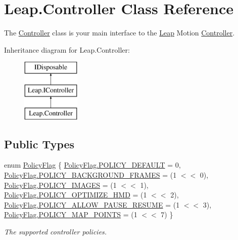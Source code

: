 \hypertarget{class_leap_1_1_controller}{}\section{Leap.\+Controller Class Reference}
\label{class_leap_1_1_controller}


The \mbox{\hyperlink{class_leap_1_1_controller}{Controller}} class is your main interface to the \mbox{\hyperlink{namespace_leap}{Leap}} Motion \mbox{\hyperlink{class_leap_1_1_controller}{Controller}}.  


Inheritance diagram for Leap.\+Controller\+:\begin{figure}[H]
\begin{center}
\leavevmode
\includegraphics[height=3.000000cm]{class_leap_1_1_controller}
\end{center}
\end{figure}
\subsection*{Public Types}
\begin{DoxyCompactItemize}
\item 
enum \mbox{\hyperlink{class_leap_1_1_controller_a0bdb49fa94aa2da8b098c1ac296528d6}{Policy\+Flag}} \{ \newline
\mbox{\hyperlink{class_leap_1_1_controller_a0bdb49fa94aa2da8b098c1ac296528d6ab59265c49564c97b26e7bcd5010a5f84}{Policy\+Flag.\+P\+O\+L\+I\+C\+Y\+\_\+\+D\+E\+F\+A\+U\+LT}} = 0, 
\mbox{\hyperlink{class_leap_1_1_controller_a0bdb49fa94aa2da8b098c1ac296528d6a9fc384525c1401b9857161b983424b2a}{Policy\+Flag.\+P\+O\+L\+I\+C\+Y\+\_\+\+B\+A\+C\+K\+G\+R\+O\+U\+N\+D\+\_\+\+F\+R\+A\+M\+ES}} = (1 $<$$<$ 0), 
\mbox{\hyperlink{class_leap_1_1_controller_a0bdb49fa94aa2da8b098c1ac296528d6a641dbeeedb2436f6a066543de846bd31}{Policy\+Flag.\+P\+O\+L\+I\+C\+Y\+\_\+\+I\+M\+A\+G\+ES}} = (1 $<$$<$ 1), 
\mbox{\hyperlink{class_leap_1_1_controller_a0bdb49fa94aa2da8b098c1ac296528d6abc23e8520336d09d968f5206793d3d8e}{Policy\+Flag.\+P\+O\+L\+I\+C\+Y\+\_\+\+O\+P\+T\+I\+M\+I\+Z\+E\+\_\+\+H\+MD}} = (1 $<$$<$ 2), 
\newline
\mbox{\hyperlink{class_leap_1_1_controller_a0bdb49fa94aa2da8b098c1ac296528d6a0c44039d577c70083c82666b332bd71b}{Policy\+Flag.\+P\+O\+L\+I\+C\+Y\+\_\+\+A\+L\+L\+O\+W\+\_\+\+P\+A\+U\+S\+E\+\_\+\+R\+E\+S\+U\+ME}} = (1 $<$$<$ 3), 
\mbox{\hyperlink{class_leap_1_1_controller_a0bdb49fa94aa2da8b098c1ac296528d6a913295f4bfba846c1ee80037a8a2b7be}{Policy\+Flag.\+P\+O\+L\+I\+C\+Y\+\_\+\+M\+A\+P\+\_\+\+P\+O\+I\+N\+TS}} = (1 $<$$<$ 7)
 \}
\begin{DoxyCompactList}\small\item\em The supported controller policies. \end{DoxyCompactList}\end{DoxyCompactItemize}
